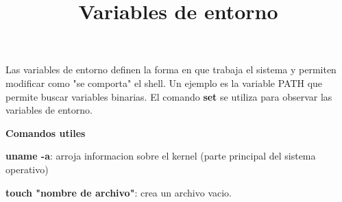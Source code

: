 \documentclass[letter paper, 12pt, oneside]{article}
\begin{document}
 \newpage
 \title{\huge\textbf{Variables de entorno}}
 
 Las variables de entorno definen la forma en que trabaja el sistema y permiten modificar como "se comporta" el shell. Un ejemplo es la variable PATH que permite buscar variables binarias. El comando \textbf{set} se utiliza para observar las variables de entorno. 
 
\textbf{Comandos utiles}



\textbf{uname -a}: arroja informacion sobre el kernel (parte principal del sistema operativo)

\textbf{touch "nombre de archivo"}: crea un archivo vacio.
\end{document}
